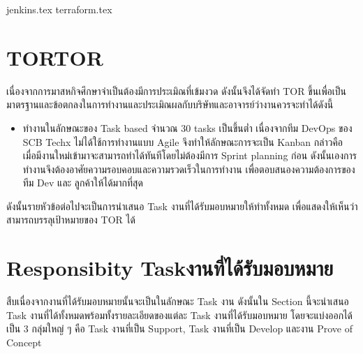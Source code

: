 \clearpage
{jenkins.tex}
\clearpage
{terraform.tex}
\clearpage

\section{\ifenglish TOR\else TOR\fi}เนื่องจากการมาสหกิจศึกษาจำเป็นต้องมีการประเมิณที่เข้มงวด ดังนั้นจึงได้จัดทำ TOR ขึ้นเพื่อเป็นมาตรฐานและข้อตกลงในการทำงานและประเมิณผลกับบริษัทและอาจารย์ว่างานควรจะทำได้ดังนี้
\begin{itemize}
      \item ทำงานในลักษณะของ Task based จำนวณ 30 tasks เป็นขึ้นต่ำ เนื่องจากทีม DevOps ของ SCB Techx ไม่ได้ใช้การทำงานแบบ Agile จึงทำให้ลักษณะการจะเป็น Kanban กล่าวคือ เมื่อมีงานใหม่เข้ามาจะสามารถทำได้ทันทีโดยไม่ต้องมีการ Sprint planning ก่อน ดังนั้นเองการทำงานจึงต้องอาศัยความรอบคอบและความรวดเร็วในการทำงาน เพื่อตอบสนองความต้องการของทีม Dev และ ลูกค้าให้ได้มากที่สุด
\end{itemize}
ดังนั้นรายหัวข้อต่อไปจะเป็นการนำเสนอ Task งานที่ได้รับมอบหมายให้ทำทั้งหมด เพื่อแสดงให้เห็นว่าสามารถบรรลุเป้าหมายของ TOR ได้

\section{\ifenglish Responsibity Task\else งานที่ได้รับมอบหมาย\fi}
สืบเนื่องจากงานที่ได้รับมอบหมายนั้นจะเป็นในลักษณะ Task งาน ดังนั้นใน Section นี้จะนำเสนอ Task งานที่ได้ทั้งหมดพร้อมทั้งรายละเอียดของแต่ละ Task งานที่ได้รับมอบหมาย โดยจะแบ่งออกได้เป็น 3 กลุ่มใหญ่ ๆ คือ Task งานที่เป็น Support, Task งานที่เป็น Develop และงาน Prove of Concept
